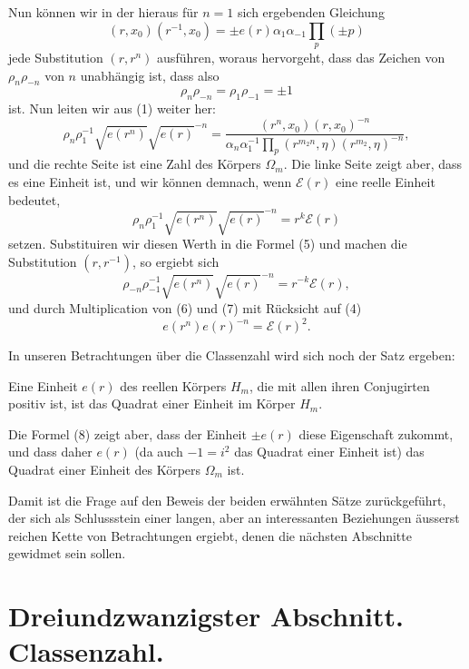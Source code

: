 \documentclass[11pt]{article}
\begin{document}
Nun können wir in der hieraus für $n=1$ sich ergebenden Gleichung
\[
(r,x_0)(r^{-1},x_0)=\pm e(r)\alpha_1\alpha_{-1}\prod_p(\pm p)
\]
jede Substitution $(r,r^n)$ ausführen, woraus hervorgeht, dass das Zeichen von $\rho_n\rho_{-n}$ von $n$ unabhängig ist, dass also
\begin{equation}
\rho_n\rho_{-n}=\rho_1\rho_{-1}=\pm1
\tag{4}
\end{equation}
ist. Nun leiten wir aus (1) weiter her:
\begin{equation}
\rho_n\rho_1^{-1}\sqrt{e(r^n)}\sqrt{e(r)}^{-n}=\frac{(r^n,x_0)(r,x_0)^{-n}}{\alpha_n\alpha_1^{-1}\prod_p(r^{m_2n},\eta)(r^{m_2},\eta)^{-n}},
\tag{5}
\end{equation}
und die rechte Seite ist eine Zahl des Körpers $\Omega_m$. Die linke Seite zeigt aber, dass es eine Einheit ist, und wir können demnach, wenn $\mathscr E(r)$ eine reelle Einheit bedeutet,
\begin{equation}
\rho_n\rho_1^{-1}\sqrt{e(r^n)}\sqrt{e(r)}^{-n}=r^k\mathscr E(r)
\tag{6}
\end{equation}
setzen. Substituiren wir diesen Werth in die Formel (5) und machen die Substitution $(r,r^{-1})$, so ergiebt sich
\begin{equation}
\rho_{-n}\rho_{-1}^{-1}\sqrt{e(r^n)}\sqrt{e(r)}^{-n}=r^{-k}\mathscr E(r),
\tag{7}
\end{equation}
und durch Multiplication von (6) und (7) mit Rücksicht auf (4)
\begin{equation}
e(r^n)e(r)^{-n}=\mathscr E(r)^2.
\tag{8}
\end{equation}

In unseren Betrachtungen über die Classenzahl wird sich noch der Satz ergeben:
\begin{center}
Eine Einheit $e(r)$ des reellen Körpers $H_m$, die mit allen ihren Conjugirten positiv ist, ist das Quadrat einer Einheit im Körper $H_m$.
\end{center}
Die Formel (8) zeigt aber, dass der Einheit $\pm e(r)$ diese Eigenschaft zukommt, und dass daher $e(r)$ (da auch $-1=i^2$ das Quadrat einer Einheit ist) das Quadrat einer Einheit des Körpers $\Omega_m$ ist.

Damit ist die Frage auf den Beweis der beiden erwähnten Sätze zurückgeführt, der sich als Schlussstein einer langen, aber an interessanten Beziehungen äusserst reichen Kette von Betrachtungen ergiebt, denen die nächsten Abschnitte gewidmet sein sollen.

\section*{Dreiundzwanzigster Abschnitt. Classenzahl.}
\end{document}
